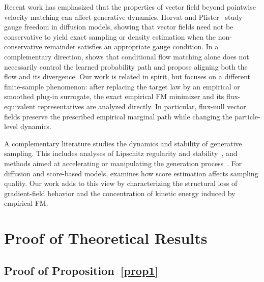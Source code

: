 \documentclass[a4paper,11pt]{article}
\theoremstyle{plain}
\theoremstyle{definition}
\begin{document}
Recent work has emphasized that the properties of vector field beyond pointwise
velocity matching can affect generative dynamics. Horvat and
Pfister~\cite{horvat2024gauge} study gauge freedom in diffusion models,
showing that vector fields need not be conservative to yield exact sampling or
density estimation when the non-conservative remainder satisfies an appropriate
gauge condition. In a complementary direction, \cite{huang2026improving} shows that conditional flow matching alone
does not necessarily control the learned probability path and propose aligning
both the flow and its divergence. Our work is related in spirit, but focuses on
a different finite-sample phenomenon: after replacing the target law by an
empirical or smoothed plug-in surrogate, the exact empirical FM minimizer and
its flux-equivalent representatives are analyzed directly. In particular,
flux-null vector fields preserve the prescribed empirical marginal path
while changing the particle-level dynamics.



A complementary literature studies the dynamics and stability of generative sampling. This includes analyses of Lipschitz regularity and stability~\cite{chen2025lipschitz}, and methods aimed at accelerating or manipulating the generation process~\cite{gagneux2025generation, stancevic2025entropic, gupta2026sharpenflowsharpnessawaresampling}. For diffusion and score-based models, \cite{hurault2025score} examines how score estimation affects sampling quality. Our work adds to this view by characterizing the structural loss of gradient-field behavior and the concentration of kinetic energy induced by empirical FM.



\section{Proof of Theoretical Results} \label{app:proof}


\subsection{Proof of Proposition~\ref{prop1}}
\end{document}
